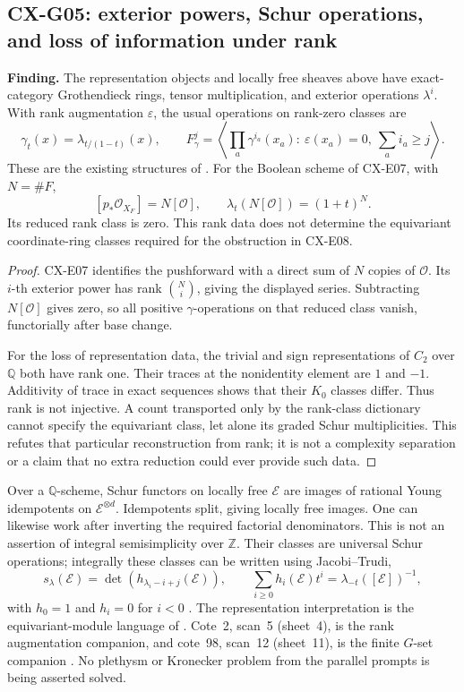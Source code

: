 \subsection{CX-G05: exterior powers, Schur operations, and loss of information under rank}
\label{finding:CX-G05}

\textbf{Finding.} The representation objects and locally free sheaves above
have exact-category Grothendieck rings, tensor multiplication, and exterior
operations $\lambda^i$.  With rank augmentation $\varepsilon$, the usual
operations on rank-zero classes are
\[
 \gamma_t(x)=\lambda_{t/(1-t)}(x),\qquad
 F^j_\gamma=\left\langle
  \prod_a\gamma^{i_a}(x_a):\ \varepsilon(x_a)=0,\ \sum_a i_a\geq j
 \right\rangle .
\]
These are the existing structures of
\cite[Exp.~V 2.4, 3.10(3.10.1); Exp.~VI 3.2--3.3]{SGA6}.
For the Boolean scheme of CX-E07, with $N=\#F$,
\[
 [p_*\mathcal O_{X_F}]=N[\mathcal O],\qquad
 \lambda_t(N[\mathcal O])=(1+t)^N.
\]
Its reduced rank class is zero.  This rank data does not determine the
equivariant coordinate-ring classes required for the obstruction in CX-E08.

\begin{proof}
CX-E07 identifies the pushforward with a direct sum of $N$ copies of
$\mathcal O$.  Its $i$-th exterior power has rank $\binom Ni$, giving the
displayed series.  Subtracting $N[\mathcal O]$ gives zero, so all positive
$\gamma$-operations on that reduced class vanish, functorially after base
change.

For the loss of representation data, the trivial and sign representations
of $C_2$ over $\mathbb Q$ both have rank one.  Their traces at the nonidentity
element are $1$ and $-1$.  Additivity of trace in exact sequences shows that
their $K_0$ classes differ.  Thus rank is not injective.  A count transported
only by the rank-class dictionary cannot specify the equivariant class,
let alone its graded Schur multiplicities.  This refutes that particular
reconstruction from rank; it is not a complexity separation or a claim
that no extra reduction could ever provide such data.
\end{proof}

Over a $\mathbb Q$-scheme, Schur functors on locally free $\mathcal E$ are
images of rational Young idempotents on $\mathcal E^{\otimes d}$.
Idempotents split, giving locally free images.  One can likewise work after
inverting the required factorial denominators.  This is not an assertion
of integral semisimplicity over $\mathbb Z$.
Their classes are universal Schur operations; integrally these classes can
be written using Jacobi--Trudi,
\[
 s_\lambda(\mathcal E)
 =\det(h_{\lambda_i-i+j}(\mathcal E)),\qquad
 \sum_{i\geq0}h_i(\mathcal E)t^i=\lambda_{-t}([\mathcal E])^{-1},
\]
with $h_0=1$ and $h_i=0$ for $i<0$
\cite[Chapter~I \S3, (3.4), p.~41]{Macdonald1995}.
The representation interpretation is the equivariant-module language of
\cite[Exp.~I 4.7.1--4.7.2]{SGA3}.  Cote~2, scan~5 (sheet~4), is the rank
augmentation companion, and cote~98, scan~12 (sheet~11), is the finite
$G$-set companion \cite{Archive2,Archive98}.  No plethysm or Kronecker
problem from the parallel prompts is being asserted solved.

